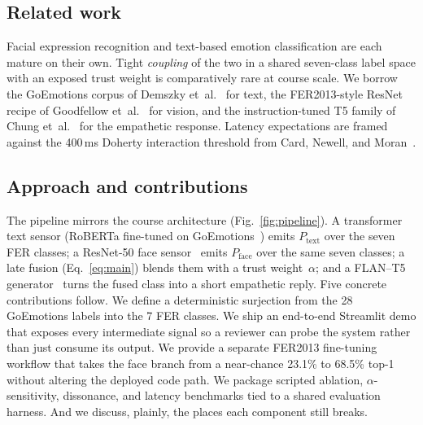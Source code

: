 \documentclass[sigconf,nonacm]{acmart}
\begin{document}
\subsection{Related work}
Facial expression recognition and text-based emotion classification are each mature on their own. Tight \emph{coupling} of the two in a shared seven-class label space with an exposed trust weight is comparatively rare at course scale. We borrow the GoEmotions corpus of Demszky et~al.~\cite{demeszky2020goemotions} for text, the FER2013-style ResNet recipe of Goodfellow et~al.~\cite{goodfellow2013challenges} for vision, and the instruction-tuned T5 family of Chung et~al.~\cite{chung2022scaling} for the empathetic response. Latency expectations are framed against the 400\,ms Doherty interaction threshold from Card, Newell, and Moran~\cite{card1983human}.

\subsection{Approach and contributions}
The pipeline mirrors the course architecture (Fig.~\ref{fig:pipeline}). A transformer text sensor (RoBERTa fine-tuned on GoEmotions~\cite{demeszky2020goemotions}) emits $P_\text{text}$ over the seven FER classes; a ResNet-50 face sensor~\cite{goodfellow2013challenges} emits $P_\text{face}$ over the same seven classes; a late fusion (Eq.~\ref{eq:main}) blends them with a trust weight~$\alpha$; and a FLAN--T5 generator~\cite{chung2022scaling} turns the fused class into a short empathetic reply. Five concrete contributions follow. We define a deterministic surjection from the 28 GoEmotions labels into the 7 FER classes. We ship an end-to-end Streamlit demo that exposes every intermediate signal so a reviewer can probe the system rather than just consume its output. We provide a separate FER2013 fine-tuning workflow that takes the face branch from a near-chance 23.1\% to 68.5\% top-1 without altering the deployed code path. We package scripted ablation, $\alpha$-sensitivity, dissonance, and latency benchmarks tied to a shared evaluation harness. And we discuss, plainly, the places each component still breaks.
\end{document}
